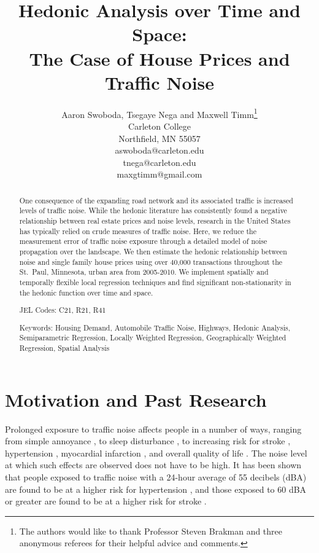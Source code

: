 \documentclass[leqno]{article}\usepackage[]{graphicx}\usepackage[]{color}
\title{Hedonic Analysis over Time and Space:\\ The Case of House Prices and Traffic Noise}
\date{}
\author{Aaron Swoboda, Tsegaye Nega and Maxwell Timm\thanks{The authors would like to thank Professor Steven Brakman and three anonymous referees for their helpful advice and comments.}
  \\ Carleton College \\  Northfield, MN 55057 \\
  aswoboda@carleton.edu \\
  tnega@carleton.edu \\
  maxgtimm@gmail.com
}
\begin{document}
\maketitle
{}
\begin{singlespace}
\begin{abstract}
One consequence of the expanding road network and its associated traffic is increased levels of traffic noise.  While the hedonic literature has consistently found a negative relationship between real estate prices and noise levels, research in the United States has typically relied on crude measures of traffic noise. Here, we reduce the measurement error of traffic noise exposure through a detailed model of noise propagation over the landscape. We then estimate the hedonic relationship between noise and single family house prices using over 40,000 transactions throughout the St.\ Paul, Minnesota, urban area from 2005-2010. We implement spatially and temporally flexible local regression techniques and find significant non-stationarity in the hedonic function over time and space.

\vspace{.3in}
\noindent
JEL Codes: C21, R21, R41

\vspace{.15in}
\noindent
Keywords: Housing Demand, Automobile Traffic Noise, Highways, Hedonic Analysis, Semiparametric Regression, Locally Weighted Regression, Geographically Weighted Regression, Spatial Analysis
\end{abstract}
\end{singlespace}

\clearpage
{} 

\section{Motivation and Past Research}\label{sec:lit}
Prolonged exposure to traffic noise affects people in a number of ways, ranging from simple annoyance \citep{Miedema2001, Ouis2001, Ohrstrom2007, DeKluizenaar2013, Weinhold2013}, to sleep disturbance , to increasing risk for stroke \citep{Sorensen2011}, hypertension \citep{Jarup2008, Bodin2009}, myocardial infarction \citep{Babisch2005}, and overall quality of life \citep{Shepherd2013}. The noise level at which such effects are observed does not have to be high.  It has been shown that people exposed to traffic noise with a 24-hour average of 55 decibels (dBA) are found to be at a higher risk for hypertension \citep{Barregard2009, Bodin2009}, and those exposed to 60 dBA or greater are found to be at a higher risk for stroke \citep{Sorensen2011}.  
\end{document}
